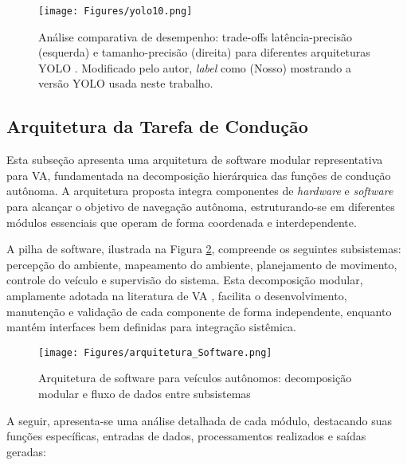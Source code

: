 \begin{figure}[H]
\centering
\texttt{[image: Figures/yolo10.png]}
\caption{Análise comparativa de desempenho: trade-offs latência-precisão (esquerda) e tamanho-precisão (direita) para diferentes arquiteturas YOLO \cite[p. ~1]{wang2024yolov10realtimeendtoendobject}. Modificado pelo autor, \textit{label} como (Nosso) mostrando a versão YOLO usada neste trabalho.}
\label{YOLO10}
\end{figure}

\subsection{Arquitetura da Tarefa de Condução} \label{ar_soft}

Esta subseção apresenta uma arquitetura de software modular representativa para VA, fundamentada na decomposição hierárquica das funções de condução autônoma. A arquitetura proposta integra componentes de \textit{hardware} e \textit{software} para alcançar o objetivo de navegação autônoma, estruturando-se em diferentes módulos essenciais que operam de forma coordenada e interdependente.

A pilha de software, ilustrada na Figura \ref{soft_ar}, compreende os seguintes subsistemas: percepção do ambiente, mapeamento do ambiente, planejamento de movimento, controle do veículo e supervisão do sistema. Esta decomposição modular, amplamente adotada na literatura de VA \cite[p. ~4]{paden2016survey}, facilita o desenvolvimento, manutenção e validação de cada componente de forma independente, enquanto mantém interfaces bem definidas para integração sistêmica.

\begin{figure}[H]
\centering
\texttt{[image: Figures/arquitetura\_Software.png]}
\caption{Arquitetura de software para veículos autônomos: decomposição modular e fluxo de dados entre subsistemas \cite[Week 2 - Lesson 3: Software Architecture. ~3min49s]{University_of_Toronto2018-fe}}
\label{soft_ar}
\end{figure}

A seguir, apresenta-se uma análise detalhada de cada módulo, destacando suas funções específicas, entradas de dados, processamentos realizados e saídas geradas:


